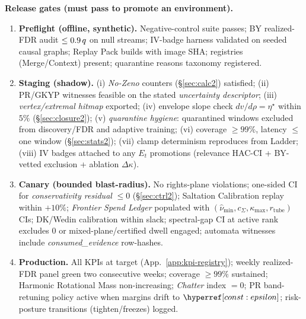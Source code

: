 \begin{constbox}
\textbf{Release gates (must pass to promote an environment).}
\begin{enumerate}[leftmargin=*]
\item \textbf{Preflight (offline, synthetic).}
Negative-control suite passes; BY realized-FDR audit $\le 0.9\,q$ on null streams; IV-badge harness validated on seeded causal graphs; Replay Pack builds with image SHA; registries (Merge/Context) present; quarantine reasons taxonomy registered.
\item \textbf{Staging (shadow).}
(i) \emph{No-Zeno} counters (\S\ref{sec:calc2}) satisfied; (ii) PR/GKYP witnesses feasible on the stated \emph{uncertainty descriptor}; (iii) \emph{vertex/extremal hitmap} exported; (iv) envelope slope check $dv/d\rho{=}\eta^\star$ within $5\%$ (\S\ref{sec:closure2}); (v) \emph{quarantine hygiene}: quarantined windows excluded from discovery/FDR and adaptive training; (vi) coverage $\ge 99\%$, latency $\le$ one window (\S\ref{sec:stats2}); (vii) clamp determinism reproduces from Ladder; (viii) IV badges attached to any $E_t$ promotions (relevance HAC-CI + BY-vetted exclusion + ablation $\Delta\kappa$).
\item \textbf{Canary (bounded blast-radius).}
No rights-plane violations; one-sided CI for \emph{conservativity residual} $\le 0$ (\S\ref{sec:ctrl2}); Saltation Calibration replay within $+10\%$; \emph{Frontier Spend Ledger} populated with $(\hat\nu_{\min},c_\Sigma,\kappa_{\max},r_{\mathrm{tube}})$ CIs; DK/Wedin calibration within slack; spectral-gap CI at active rank excludes $0$ or mixed-plane/certified dwell engaged; automata witnesses include \emph{consumed\_evidence} row-hashes.
\item \textbf{Production.}
All KPIs at target (App.~\ref{app:kpi-registry}); weekly realized-FDR panel green two consecutive weeks; coverage $\ge 99\%$ sustained; Harmonic Rotational Mass non-increasing; \emph{Chatter} index $=0$; PR band-retuning policy active when margins drift to $\constref{epsilon}$; risk-posture transitions (tighten/freezes) logged.
\end{enumerate}
\end{constbox}

